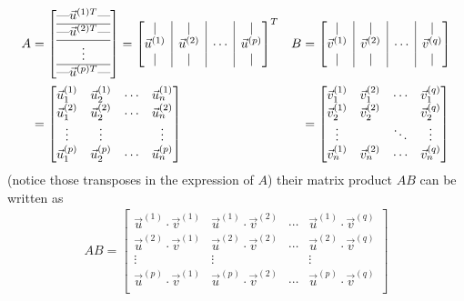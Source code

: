 \begin{align*}
A &= \left[\begin{array}{@{}c@{}}
\text{---} \vec{u}^{(1)T} \text{---} \\
\hline
\text{---} \vec{u}^{(2)T} \text{---} \\
\hline
\vdots \\
\hline
\text{---} \vec{u}^{(p)T} \text{---}
\end{array}\right]
=  \left[\begin{array}{@{}c|c|c|c@{}}
| & | & & | \\
\vec{u}^{(1)} & \vec{u}^{(2)} & \cdots & \vec{u}^{(p)} \\
| & | & & |
\end{array}\right]^T
& B &= \left[\begin{array}{@{}c|c|c|c@{}}
| & | & & | \\
\vec{v}^{(1)} & \vec{v}^{(2)} & \cdots & \vec{v}^{(q)} \\
| & | & & |
\end{array}\right]\\
&= 
\begin{bmatrix}
\vec{u}^{(1)}_1  & \vec{u}^{(1)}_2 & \cdots & \vec{u}^{(1)}_n \\
\vec{u}^{(2)}_1  & \vec{u}^{(2)}_2 & \cdots & \vec{u}^{(2)}_n \\
\vdots & \vdots & & \vdots \\
\vec{u}^{(p)}_1  & \vec{u}^{(p)}_2 & \cdots & \vec{u}^{(p)}_n
\end{bmatrix} 
& &= 
\begin{bmatrix}
\vec{v}^{(1)}_1  & \vec{v}^{(2)}_1 & \cdots & \vec{v}^{(q)}_1 \\
\vec{v}^{(1)}_2  & \vec{v}^{(2)}_2 & & \vec{v}^{(q)}_2 \\
\vdots & & \ddots & \vdots \\
\vec{v}^{(1)}_n  & \vec{v}^{(2)}_n & \cdots & \vec{v}^{(q)}_n \\
\end{bmatrix} 
\end{align*}
(notice those transposes in the expression of $A$) their matrix product $AB$ can be written as
\begin{align*}
AB =
\begin{bmatrix}
\vec{u}^{(1)} \cdot \vec{v}^{(1)} & \vec{u}^{(1)} \cdot \vec{v}^{(2)} & \cdots & \vec{u}^{(1)} \cdot \vec{v}^{(q)} \\
\vec{u}^{(2)} \cdot \vec{v}^{(1)} & \vec{u}^{(2)} \cdot \vec{v}^{(2)} & \cdots & \vec{u}^{(2)} \cdot \vec{v}^{(q)} \\
\vdots & \vdots & & \vdots \\
\vec{u}^{(p)} \cdot \vec{v}^{(1)} & \vec{u}^{(p)} \cdot \vec{v}^{(2)} & \cdots & \vec{u}^{(p)} \cdot \vec{v}^{(q)} \\
\end{bmatrix}
\end{align*}
